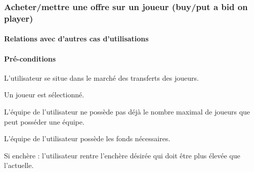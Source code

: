 
\subsubsection{Acheter/mettre une offre sur un joueur (buy/put a bid on player)}
\label{UC:buyPlayer}
\paragraph{Relations avec d'autres cas d'utilisations}
\paragraph{Pré-conditions}
\begin{list}{}{\leftmargin=1.5em}
\item{L'utilisateur se situe dans le marché des transferts des joueurs.}
\item{Un joueur est sélectionné.}
\item{L'équipe de l'utilisateur ne possède pas déjà le nombre maximal de joueurs que peut posséder une équipe.}
\item{L'équipe de l'utilisateur possède les fonds nécessaires.}
\item{Si enchère : l'utilisateur rentre l'enchère désirée qui doit être plus élevée que l'actuelle.}
\end{list}
